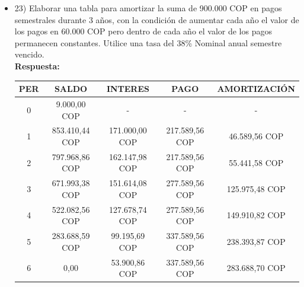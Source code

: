 \begin{itemize}
 \item 23) Elaborar una tabla para amortizar la suma de 900.000 COP en pagos semestrales durante 3 años, con la condición de aumentar cada año el valor de los pagos en 60.000 COP pero dentro de cada año el valor de los pagos permanecen constantes. Utilice una tasa del 38\% Nominal anual semestre vencido.\\
       \textbf{Respuesta:}\\
       \begin{center}
        \begin{tabular}{| c | c | c | c | c |}\hline
           \textbf{PER} & \textbf{SALDO} & \textbf{INTERES} & \textbf{PAGO} & \textbf{AMORTIZACIÓN}  \\ \hline
        0 & 9.000,00 COP & - & - & -  \\ \hline
        1 & 853.410,44 COP & 171.000,00 COP & 217.589,56 COP & 46.589,56 COP \\ \hline
        2 & 797.968,86 COP & 162.147,98 COP & 217.589,56 COP & 55.441,58 COP \\ \hline
        3 & 671.993,38 COP & 151.614,08 COP & 277.589,56 COP & 125.975,48 COP \\ \hline
        4 & 522.082,56 COP & 127.678,74 COP & 277.589,56 COP & 149.910,82 COP \\ \hline
        5 & 283.688,59 COP & 99.195,69 COP & 337.589,56 COP & 238.393,87 COP \\ \hline
        6 & 0,00 & 53.900,86 COP & 337.589,56 COP & 283.688,70 COP \\ \hline
        \end{tabular}\\
        \end{center}


\end{itemize}
